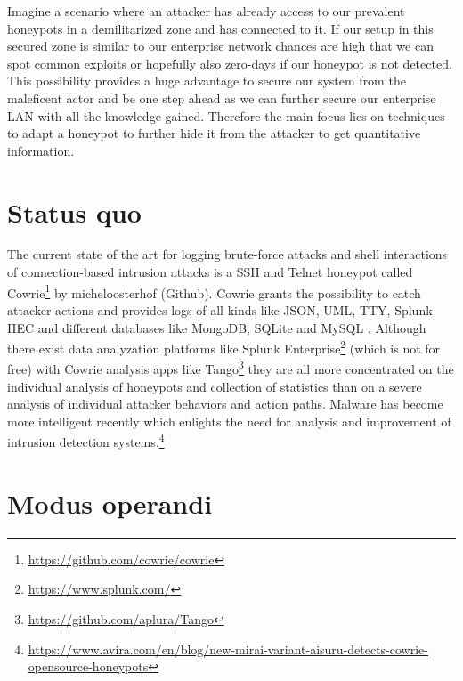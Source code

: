 \documentclass[fontsize=11pt, paper=a4, parskip=half]{scrartcl}
\begin{document}
Imagine a scenario where an attacker has already access to our prevalent honeypots in a demilitarized zone and has connected to it. If our setup in this secured zone is similar to our enterprise network chances are high that we can spot common exploits or hopefully also zero-days if our honeypot is not detected. This possibility provides a huge advantage to secure our system from the maleficent actor and be one step ahead as we can further secure our enterprise LAN with all the knowledge gained. Therefore the main focus lies on techniques to adapt a honeypot to further hide it from the attacker to get quantitative information.

\pagebreak
\section{Status quo}
The current state of the art for logging brute-force attacks and shell interactions of connection-based intrusion attacks is a SSH and Telnet honeypot called Cowrie\footnote{\url{https://github.com/cowrie/cowrie}} by micheloosterhof (Github). Cowrie grants the possibility to catch attacker actions and provides logs  of all kinds like JSON, UML, TTY, Splunk HEC and different databases like MongoDB, SQLite and MySQL \cite{cowrie:artefacts}. Although there exist data analyzation platforms like Splunk Enterprise\footnote{\url{https://www.splunk.com/}} (which is not for free) with Cowrie analysis apps like Tango\footnote{\url{https://github.com/aplura/Tango}} they are all more concentrated on the individual analysis of honeypots and collection of statistics than on a severe analysis of individual attacker behaviors and action paths. Malware has become more intelligent recently which enlights the need for analysis and improvement of intrusion detection systems.\footnote{\url{https://www.avira.com/en/blog/new-mirai-variant-aisuru-detects-cowrie-opensource-honeypots}}

\section{Modus operandi}
\end{document}
